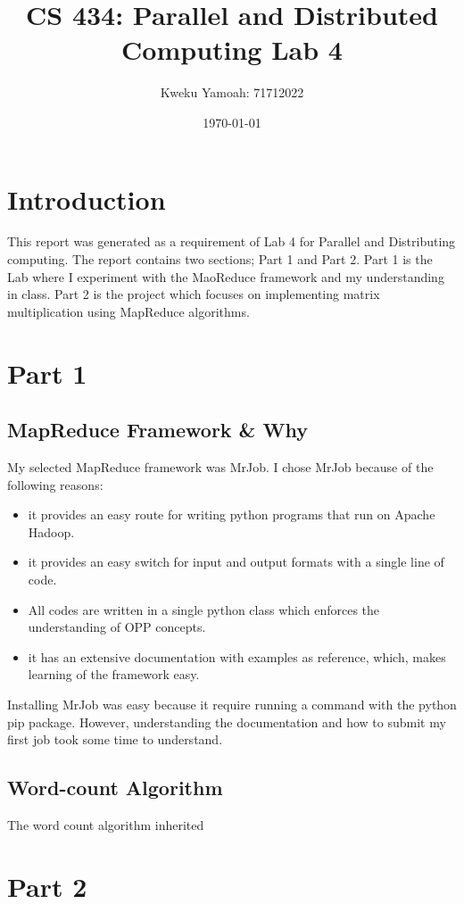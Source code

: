 \documentclass[12pt, a4paper, fleqn, titlepage]{article}
\title{\textbf{CS 434: Parallel and Distributed Computing Lab 4}}
\author{Kweku Yamoah: 71712022}
\date{\today}
\begin{document}
\maketitle
\section*{Introduction}
    This report was generated as a requirement of Lab 4 for Parallel and Distributing computing. The report contains two sections; Part 1 and Part 2. Part 1 is the Lab where I experiment with the MaoReduce framework and my understanding in class. Part 2 is the project which focuses on implementing matrix multiplication using MapReduce algorithms. 
\section*{Part 1}
    \subsection*{MapReduce Framework \& Why}
    My selected MapReduce framework was MrJob. I chose MrJob because of the following reasons:
        \begin{itemize}
            \item it provides an easy route for writing python programs that run on Apache Hadoop.
            \item it provides an easy switch for input and output formats with a single line of code.
            \item All codes are written in a single python class which enforces the understanding of OPP concepts.
            \item it has an extensive documentation with examples as reference, which, makes learning of the framework easy.
        \end{itemize}
    Installing MrJob was easy because it require running a command with the python pip package. However, understanding the documentation and how to submit my first job took some time to understand.

    \subsection*{Word-count Algorithm}
        The word count algorithm inherited 

\section*{Part 2}
\end{document}
